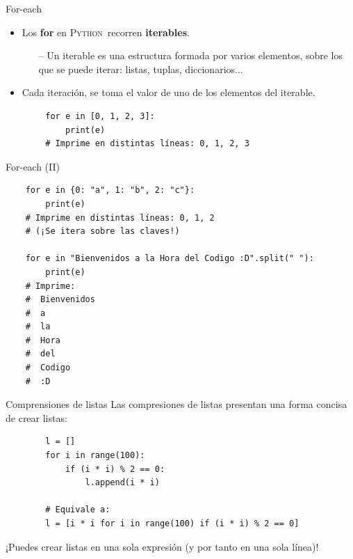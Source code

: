 \documentclass[10pt]{beamer} %
\newcommand{\py}{\textsc{Python}}
\begin{document}
\begin{frame}[fragile]{For-each}
    \begin{itemize}
        \item Los \textbf{for} en \py\, recorren \textbf{iterables}.
        \begin{itemize}
            \item[--] Un iterable es una estructura formada por varios elementos, sobre los que se puede iterar: listas, tuplas, diccionarios...
        \end{itemize}
        \item Cada iteración, se toma el valor de uno de los elementos del iterable.
    \end{itemize}
    \begin{verbatim}
        for e in [0, 1, 2, 3]:
            print(e)
        # Imprime en distintas líneas: 0, 1, 2, 3
    \end{verbatim}
\end{frame}

\begin{frame}[fragile]{For-each (II)}
    \begin{verbatim}
    for e in {0: "a", 1: "b", 2: "c"}:
        print(e)
    # Imprime en distintas líneas: 0, 1, 2
    # (¡Se itera sobre las claves!)
    
    for e in "Bienvenidos a la Hora del Codigo :D".split(" "):
        print(e)
    # Imprime:
    #  Bienvenidos
    #  a
    #  la
    #  Hora
    #  del
    #  Codigo
    #  :D
    \end{verbatim}
\end{frame}

\begin{frame}[fragile]{Comprensiones de listas}
    Las compresiones de listas presentan una forma concisa de crear listas:
    \begin{verbatim}
        l = []
        for i in range(100):
            if (i * i) % 2 == 0:
                l.append(i * i)
        
        # Equivale a:
        l = [i * i for i in range(100) if (i * i) % 2 == 0]
    \end{verbatim}
    ¡Puedes crear listas en una sola expresión (y por tanto en una sola línea)!
\end{frame}
\end{document}
